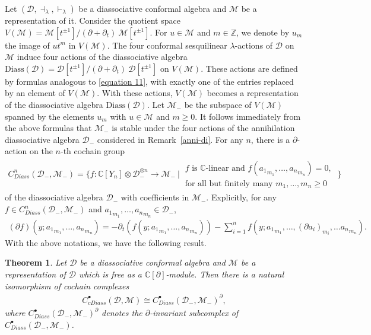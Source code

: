 \documentclass[a4paper,reqno,10pt]{amsart}
\theoremstyle{plain}
\newtheorem{theorem}[thm]{Theorem}
\theoremstyle{definition}
\theoremstyle{remark}
\newcommand{\C}{\mathbb{C}}
\newcommand{\D}{\mathcal{D}}
\newcommand{\M}{\mathcal{M}}
\newcommand{\p}{\partial}
\newcommand{\la}{\lambda}
\begin{document}
Let $(\D, \dashv_\la, \vdash_\la)$ be a diassociative conformal algebra and $\M$ be a representation of it. Consider the quotient space $V (\M) = \M[t^{\pm 1}]\big/{(\p + \p_t)~ \!\M[t^{\pm 1}]}$. For $u\in\M$ and $m\in\mathbb{Z}$, we denote by $u_m$ the image of $ut^m$ in $V (\M)$. The four conformal sesquilinear $\la$-actions of $\D$ on $\M$ induce four actions of the diassociative algebra $\mathrm{Diass} (\D) = \D[t^{\pm1}]\big/(\partial+\partial_t) ~ \! \D[t^{\pm1}]$ on $V (\M)$. These actions are defined by formulas analogous to \eqref{equation 11}, with exactly one of the entries replaced by an element of $V(\M)$. With these actions, $V(\M)$ becomes a representation of the diassociative algebra $\mathrm{Diass} (\D)$. Let $\M_-$ be the subspace of $V(\M)$ spanned by the elements $u_m$ with $u\in\M$ and $m\geq0$. It follows immediately from the above formulas that $\M_-$ is stable under the four actions of the annihilation diassociative algebra $\D_-$ considered in Remark~\ref{anni-di}. For any $n$, there is a $\p$-action on the $n$-th cochain group 
\begin{align*}
    C^n_{Diass} (\D_{-},\M_{-}) = \big\{ f : \C [Y_n] \otimes \D_{-}^{\otimes n} \rightarrow \M_{-} ~ \! \big| ~ \! \substack{ f \text{ is } \C\text{-linear and } f ({a_1}_{m_1}, \ldots, {a_n}_{m_n} ) = 0, ~ \\  \text{for all but finitely many } m_1, \ldots, m_n \geq 0 } \big\}
\end{align*}
of the diassociative algebra $\D_-$ with coefficients in $\M_-$. Explicitly, for any $f \in C^n_{Diass}(\D_{-},\M_{-})$ and ${a_1}_{m_1}, \ldots, {a_n}_{m_n} \in \D_-$,
\begin{align}\label{delta-action}
    (\p f)(y;{a_1}_{m_1}, \ldots, {a_n}_{m_n})= -\p_t(f(y;{a_1}_{m_1}, \ldots, {a_n}_{m_n})) - \sum_{i=1}^{n}f(y;{a_1}_{m_1}, \ldots, {(\p a_i)}_{m_i}, \ldots {a_n}_{m_n}).
\end{align}
With the above notations, we have the following result.
\begin{theorem}\label{th-39}
Let $\mathcal{D}$ be a diassociative conformal algebra and $\M$ be
a representation of $\mathcal{D}$ which is free as a
$\mathbb{C}[\partial]$-module. Then there is a natural isomorphism of
cochain complexes
\begin{align*}
C^\bullet_{cDiass}(\mathcal{D},\M)
\cong
C^\bullet_{Diass}
(\D_{-},\M_{-})^{\partial},
\end{align*}
where $C^\bullet_{Diass}
(\D_{-}, \M_{-})^\p$ denotes the $\p$-invariant subcomplex of $C^\bullet_{Diass}
(\D_{-}, \M_{-})$.
\end{theorem}
\end{document}
